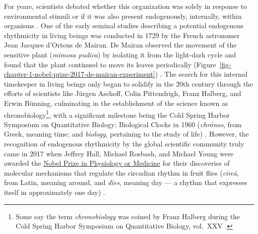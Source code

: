 \documentclass[
12pt,
openright,
oneside,
a4paper,
chapter=TITLE,
section=TITLE,
french,
spanish,
brazil,
english
]{abntex2}\usepackage{array}
\begin{document}
For years, scientists debated whether this organization was solely in
response to environmental stimuli or if it was also present
endogenously, internally, within organisms \autocite{rotenberg2003}. One
of the early seminal studies describing a potential endogenous
rhythmicity in living beings was conducted in 1729 by the French
astronomer Jean Jacques d'Ortous de Mairan. De Mairan observed the
movement of the sensitive plant (\emph{mimosa pudica}) by isolating it
from the light-dark cycle and found that the plant continued to move its
leaves periodically
(Figure~\ref{fig-chapter-1-nobel-prize-2017-de-mairan-experiment})
\autocite{foster2005,rotenberg2003}. The search for this internal
timekeeper in living beings only began to solidify in the 20th century
through the efforts of scientists like Jürgen Aschoff, Colin
Pittendrigh, Franz Halberg, and Erwin Bünning, culminating in the
establishment of the science known as chronobiology\footnote{Some say
  the term \emph{chronobiology} was coined by Franz Halberg during the
  Cold Spring Harbor Symposium on Quantitative Biology, vol.~XXV
  \autocite[p.~21]{menna-barreto2023}.}, with a significant milestone
being the Cold Spring Harbor Symposium on Quantitative Biology:
Biological Clocks in 1960 (\emph{chrónos}, from Greek, meaning time; and
\emph{biology}, pertaining to the study of life)
\autocite{rotenberg2003,coldspringharborlaboratory}. However, the
recognition of endogenous rhythmicity by the global scientific community
truly came in 2017 when Jeffrey Hall, Michael Rosbash, and Michael Young
were awarded the
\href{https://www.nobelprize.org/prizes/medicine/2017/press-release/}{Nobel
Prize in Physiology or Medicine} for their discoveries of molecular
mechanisms that regulate the circadian rhythm in fruit flies
(\emph{circā}, from Latin, meaning around, and \emph{dĭes}, meaning day
\autocite{latinitium} --- a rhythm that expresses itself in
approximately one day) \autocite{nobelprizeoutreachab}.
\end{document}
